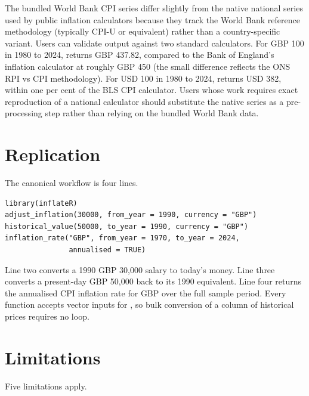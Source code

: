 The bundled World Bank CPI series differ slightly from the native
national series used by public inflation calculators because they
track the World Bank reference methodology (typically CPI-U or
equivalent) rather than a country-specific variant. Users can
validate  output against two standard
calculators. For GBP 100 in 1980 to 2024, 
returns GBP 437.82, compared to the Bank of England's inflation
calculator at roughly GBP 450 (the small difference reflects the
ONS RPI vs CPI methodology). For USD 100 in 1980 to 2024,
 returns USD 382,
within one per cent of the BLS CPI calculator. Users whose work
requires exact reproduction of a national calculator should
substitute the native series as a pre-processing step rather than
relying on the bundled World Bank data.

\section{Replication}\label{replication}

The canonical workflow is four lines.

\begin{verbatim}
library(inflateR)
adjust_inflation(30000, from_year = 1990, currency = "GBP")
historical_value(50000, to_year = 1990, currency = "GBP")
inflation_rate("GBP", from_year = 1970, to_year = 2024,
               annualised = TRUE)
\end{verbatim}

Line two converts a 1990 GBP 30,000 salary to today's money. Line
three converts a present-day GBP 50,000 back to its 1990
equivalent. Line four returns the annualised CPI inflation rate
for GBP over the full sample period. Every function accepts vector
inputs for , so bulk conversion of a column of
historical prices requires no loop.

\section{Limitations}\label{limitations}

Five limitations apply.


